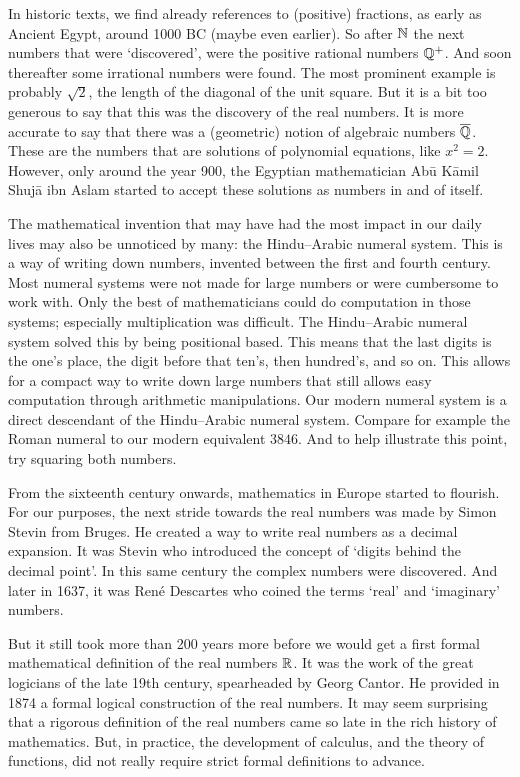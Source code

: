 In historic texts, we find already references to (positive) fractions, as early as Ancient Egypt, around 1000 BC (maybe even earlier). So after $\mathbb{N}$ the next numbers that were `discovered', were the positive rational numbers $\mathbb{Q}^+$. And soon thereafter some irrational numbers were found. The most prominent example is probably $\sqrt{2}$, the length of the diagonal of the unit square. But it is a bit too generous to say that this was the discovery of the real numbers. It is more accurate to say that there was a (geometric) notion of algebraic numbers $\overline{\mathbb{Q}}$. These are the numbers that are solutions of polynomial equations, like $x^2 = 2$. However, only around the year 900, the Egyptian mathematician Abū Kāmil Shujā ibn Aslam started to accept these solutions as numbers in and of itself.

The mathematical invention that may have had the most impact in our daily lives may also be unnoticed by many: the Hindu--Arabic numeral system. This is a way of writing down numbers, invented between the first and fourth century. Most numeral systems were not made for large numbers or were cumbersome to work with. Only the best of mathematicians could do computation in those systems; especially multiplication was difficult. The Hindu--Arabic numeral system solved this by being positional based. This means that the last digits is the one's place, the digit before that ten's, then hundred's, and so on. This allows for a compact way to write down large numbers that still allows easy computation through arithmetic manipulations. Our modern numeral system is a direct descendant of the Hindu--Arabic numeral system. Compare for example the Roman numeral \uppercase\expandafter{\relax} to our modern equivalent $3846$. And to help illustrate this point, try squaring both numbers.

From the sixteenth century onwards, mathematics in Europe started to flourish. For our purposes, the next stride towards the real numbers was made by Simon Stevin from Bruges. He created a way to write real numbers as a decimal expansion. It was Stevin who introduced the concept of `digits behind the decimal point'. In this same century the complex numbers were discovered. And later in 1637, it was René Descartes who coined the terms `real' and `imaginary' numbers.

But it still took more than 200 years more before we would get a first formal mathematical definition of the real numbers $\mathbb{R}$. It was the work of the great logicians of the late 19th century, spearheaded by Georg Cantor. He provided in 1874 a formal logical construction of the real numbers. It may seem surprising that a rigorous definition of the real numbers came so late in the rich history of mathematics. But, in practice, the development of calculus, and the theory of functions, did not really require strict formal definitions to advance.

